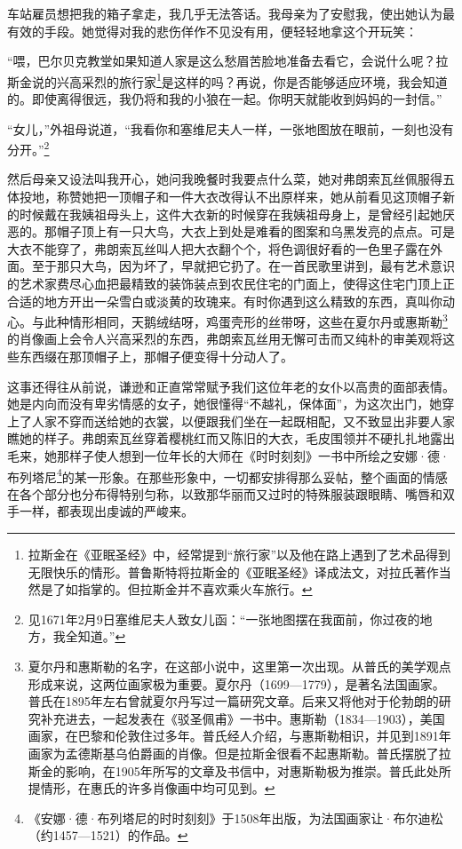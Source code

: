 \par 车站雇员想把我的箱子拿走，我几乎无法答话。我母亲为了安慰我，使出她认为最有效的手段。她觉得对我的悲伤佯作不见没有用，便轻轻地拿这个开玩笑：
\par “喂，巴尔贝克教堂如果知道人家是这么愁眉苦脸地准备去看它，会说什么呢？拉斯金说的兴高采烈的旅行家\footnote{拉斯金在《亚眠圣经》中，经常提到“旅行家”以及他在路上遇到了艺术品得到无限快乐的情形。普鲁斯特将拉斯金的《亚眠圣经》译成法文，对拉氏著作当然是了如指掌的。但拉斯金并不喜欢乘火车旅行。}是这样的吗？再说，你是否能够适应环境，我会知道的。即使离得很远，我仍将和我的小狼在一起。你明天就能收到妈妈的一封信。”
\par “女儿，”外祖母说道，“我看你和塞维尼夫人一样，一张地图放在眼前，一刻也没有分开。”\footnote{见1671年2月9日塞维尼夫人致女儿函：“一张地图摆在我面前，你过夜的地方，我全知道。”}
\par 然后母亲又设法叫我开心，她问我晚餐时我要点什么菜，她对弗朗索瓦丝佩服得五体投地，称赞她把一顶帽子和一件大衣改得认不出原样来，她从前看见这顶帽子新的时候戴在我姨祖母头上，这件大衣新的时候穿在我姨祖母身上，是曾经引起她厌恶的。那帽子顶上有一只大鸟，大衣上到处是难看的图案和乌黑发亮的点点。可是大衣不能穿了，弗朗索瓦丝叫人把大衣翻个个，将色调很好看的一色里子露在外面。至于那只大鸟，因为坏了，早就把它扔了。在一首民歌里讲到，最有艺术意识的艺术家费尽心血把最精致的装饰装点到农民住宅的门面上，使得这住宅门顶上正合适的地方开出一朵雪白或淡黄的玫瑰来。有时你遇到这么精致的东西，真叫你动心。与此种情形相同，天鹅绒结呀，鸡蛋壳形的丝带呀，这些在夏尔丹或惠斯勒\footnote{夏尔丹和惠斯勒的名字，在这部小说中，这里第一次出现。从普氏的美学观点形成来说，这两位画家极为重要。夏尔丹（1699—1779），是著名法国画家。普氏在1895年左右曾就夏尔丹写过一篇研究文章。后来又将他对于伦勃朗的研究补充进去，一起发表在《驳圣佩甫》一书中。惠斯勒（1834—1903），美国画家，在巴黎和伦敦住过多年。普氏经人介绍，与惠斯勒相识，并见到1891年画家为孟德斯基乌伯爵画的肖像。但是拉斯金很看不起惠斯勒。普氏摆脱了拉斯金的影响，在1905年所写的文章及书信中，对惠斯勒极为推崇。普氏此处所提情形，在惠氏的许多肖像画中均可见到。}的肖像画上会令人兴高采烈的东西，弗朗索瓦丝用无懈可击而又纯朴的审美观将这些东西缀在那顶帽子上，那帽子便变得十分动人了。
\par 这事还得往从前说，谦逊和正直常常赋予我们这位年老的女仆以高贵的面部表情。她是内向而没有卑劣情感的女子，她很懂得“不越礼，保体面”，为这次出门，她穿上了人家不穿而送给她的衣裳，以便跟我们坐在一起既相配，又不致显出非要人家瞧她的样子。弗朗索瓦丝穿着樱桃红而又陈旧的大衣，毛皮围领并不硬扎扎地露出毛来，她那样子使人想到一位年长的大师在《时时刻刻》一书中所绘之安娜·德·布列塔尼\footnote{《安娜·德·布列塔尼的时时刻刻》于1508年出版，为法国画家让·布尔迪松（约1457—1521）的作品。}的某一形象。在那些形象中，一切都安排得那么妥帖，整个画面的情感在各个部分也分布得特别匀称，以致那华丽而又过时的特殊服装跟眼睛、嘴唇和双手一样，都表现出虔诚的严峻来。
